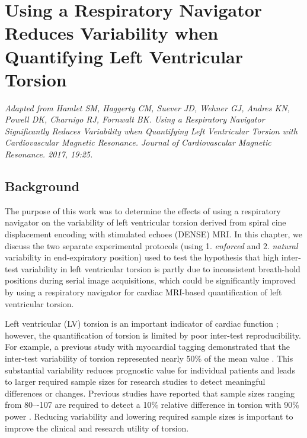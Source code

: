 \chapter{Using a Respiratory Navigator Reduces Variability when Quantifying Left Ventricular Torsion}

\begin{center}
\textit{Adapted from Hamlet SM, Haggerty CM, Suever JD, Wehner GJ, Andres KN, Powell DK, Charnigo RJ, Fornwalt BK. Using a Respiratory Navigator Significantly Reduces Variability when Quantifying Left Ventricular Torsion with Cardiovascular Magnetic Resonance. Journal of Cardiovascular Magnetic Resonance. 2017, 19:25.} \cite{Hamlet2017}
\end{center}

\section{Background}
	The purpose of this work was to determine the effects of using a respiratory navigator on the variability of left ventricular torsion derived from spiral cine displacement encoding with stimulated echoes (DENSE) MRI. In this chapter, we discuss the two separate experimental protocols (using 1. \textit{enforced} and 2. \textit{natural} variability in end-expiratory position) used to test the hypothesis that high inter-test variability in left ventricular torsion is partly due to inconsistent breath-hold positions during serial image acquisitions, which could be significantly improved by using a respiratory navigator for cardiac MRI-based quantification of left ventricular torsion.

	Left ventricular (LV) torsion is an important indicator of cardiac function \cite{Russel2011b,Gotte2006a}; however, the quantification of torsion is limited by poor inter-test reproducibility. For example, a previous study with myocardial tagging demonstrated that the inter-test variability of torsion represented nearly 50\% of the mean value \cite{Donekal2013a}. This substantial variability reduces prognostic value for individual patients and leads to larger required sample sizes for research studies to detect meaningful differences or changes. Previous studies have reported that sample sizes ranging from 80–-107 are required to detect a 10\% relative difference in torsion with 90\% power \cite{Donekal2013a,Kowallick2016,Kaku2014a}. Reducing variability and lowering required sample sizes is important to improve the clinical and research utility of torsion.
	
